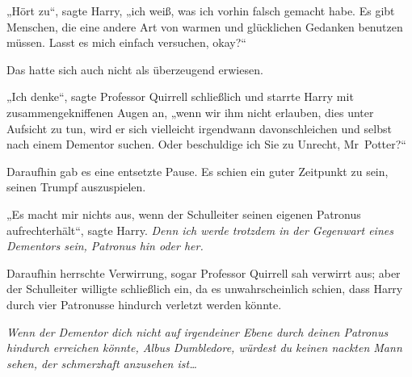 „Hört zu“, sagte Harry, „ich weiß, was ich vorhin falsch gemacht habe. Es gibt Menschen, die eine andere Art von warmen und glücklichen Gedanken benutzen müssen. Lasst es mich einfach versuchen, okay?“

Das hatte sich auch nicht als überzeugend erwiesen.

„Ich denke“, sagte Professor Quirrell schließlich und starrte Harry mit zusammengekniffenen Augen an, „wenn wir ihm nicht erlauben, dies unter Aufsicht zu tun, wird er sich vielleicht irgendwann davonschleichen und selbst nach einem Dementor suchen. Oder beschuldige ich Sie zu Unrecht, Mr~Potter?“

Daraufhin gab es eine entsetzte Pause. Es schien ein guter Zeitpunkt zu sein, seinen Trumpf auszuspielen.

„Es macht mir nichts aus, wenn der Schulleiter seinen eigenen Patronus aufrechterhält“, sagte Harry. \emph{Denn ich werde trotzdem in der Gegenwart eines Dementors sein, Patronus hin oder her.}

Daraufhin herrschte Verwirrung, sogar Professor Quirrell sah verwirrt aus; aber der Schulleiter willigte schließlich ein, da es unwahrscheinlich schien, dass Harry durch vier Patronusse hindurch verletzt werden könnte.

\emph{Wenn der Dementor dich nicht auf irgendeiner Ebene durch deinen Patronus hindurch erreichen könnte, Albus Dumbledore, würdest du keinen nackten Mann sehen, der schmerzhaft anzusehen ist…}

